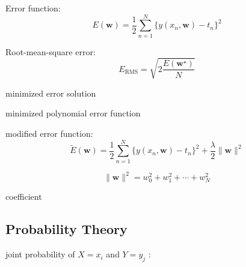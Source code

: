 \documentclass[11pt, a4paper, oneside]{book}
\begin{document}
\bigskip

\noindent
Error function:
\begin{equation}
E(\mathbf{w})
= \frac{1}{2} \sum_{n=1}^N \{ y(x_n, \mathbf{w}) - t_n\} ^2
\tag{1.2}
\end{equation}

\bigskip

\noindent
Root-mean-square error:
\begin{equation}
E_{\text{RMS}} = \sqrt{ 2\frac{E(\mathbf{w}^\star)}{N} }
\tag{1.3}
\end{equation}

\begin{description}[labelwidth=\widthof{\bfseries 1234567890},align=parright]
	\item[$\mathbf{w}^\star:$] minimized error solution
	\item[$ y(x, \mathbf{w}^\star ):$] minimized polynomial error function
\end{description}

\bigskip

\noindent
modified error function:
\begin{equation}
\tilde{E}(\mathbf{w})
= \frac{1}{2} \sum_{n=1}^N \{ y(x_n, \mathbf{w}) - t_n \} ^2
+ \frac{\lambda}{2} \| \mathbf{w} \| ^2
\tag{1.4}
\end{equation}

$$
\| \mathbf{w} \| ^2 = w_0^2 + w_1^2 + \cdots + w_N^2
$$

\begin{description}[labelwidth=\widthof{\bfseries 1234567890},align=parright]
	\item[$\lambda :$] coefficient
\end{description}

\bigskip

\subsection{Probability Theory}

\begin{center}
\end{center}

\noindent
joint probability of $X = x_i$ and $Y = y_j$ :
\end{document}
